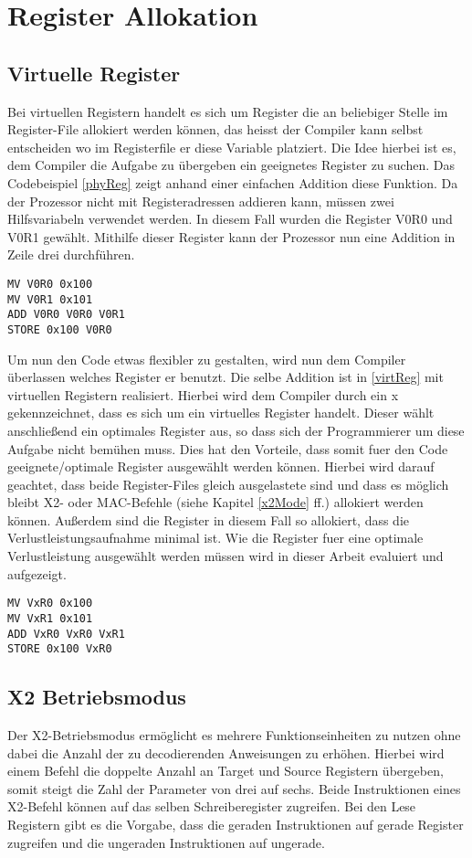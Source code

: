 \section{Register Allokation}
\label{sec:register allok}
\subsection{Virtuelle Register}
Bei virtuellen Registern handelt es sich um Register die an beliebiger Stelle im Register-File allokiert werden können, das heisst der Compiler kann selbst entscheiden wo im Registerfile er diese Variable platziert. 
Die Idee hierbei ist es, dem Compiler die Aufgabe zu übergeben ein geeignetes Register zu suchen. Das Codebeispiel \ref{phyReg} zeigt anhand einer einfachen Addition diese Funktion. Da der Prozessor nicht mit Registeradressen addieren kann, müssen zwei Hilfsvariabeln verwendet werden. In diesem Fall wurden die Register V0R0 und V0R1 gewählt. Mithilfe dieser Register kann der Prozessor nun eine Addition in Zeile drei durchführen.
\renewcommand{\lstlistingname}{Codebeispiel}
\begin{lstlisting}[frame=single, caption={physikalische Register},captionpos=b,label=phyReg]
MV V0R0 0x100
MV V0R1 0x101
ADD V0R0 V0R0 V0R1
STORE 0x100 V0R0
\end{lstlisting}
Um nun den Code etwas flexibler zu gestalten, wird  nun dem Compiler überlassen welches Register er benutzt. Die selbe Addition ist in \ref{virtReg} mit virtuellen Registern realisiert. Hierbei wird dem Compiler durch ein  x gekennzeichnet, dass es sich um ein virtuelles Register handelt. Dieser wählt anschließend ein optimales Register aus, so dass sich der Programmierer um diese Aufgabe nicht bemühen muss. Dies hat den Vorteile, dass somit fuer den Code geeignete/optimale Register ausgewählt werden können. Hierbei wird darauf geachtet, dass beide Register-Files gleich ausgelastete sind und dass es möglich bleibt X2- oder MAC-Befehle (siehe Kapitel \ref{x2Mode} ff.) allokiert werden können. Außerdem sind die Register in diesem Fall so allokiert, dass die Verlustleistungsaufnahme minimal ist. Wie die Register fuer eine optimale Verlustleistung ausgewählt werden müssen wird in dieser Arbeit evaluiert und aufgezeigt.

\begin{lstlisting}[frame=single,caption={virtuelle Register},captionpos=b,label=virtReg]
MV VxR0 0x100
MV VxR1 0x101
ADD VxR0 VxR0 VxR1
STORE 0x100 VxR0
\end{lstlisting}
\subsection{X2 Betriebsmodus}\label{subsec:x2Mode}
Der X2-Betriebsmodus ermöglicht es mehrere Funktionseinheiten zu nutzen ohne dabei die Anzahl der zu decodierenden Anweisungen zu erhöhen. Hierbei wird einem Befehl die doppelte Anzahl an Target und Source Registern übergeben, somit steigt die Zahl der Parameter von drei auf sechs. Beide Instruktionen eines X2-Befehl können auf das selben Schreiberegister zugreifen. Bei den Lese Registern gibt es die Vorgabe, dass die geraden Instruktionen auf gerade Register zugreifen und die ungeraden Instruktionen auf ungerade.%
